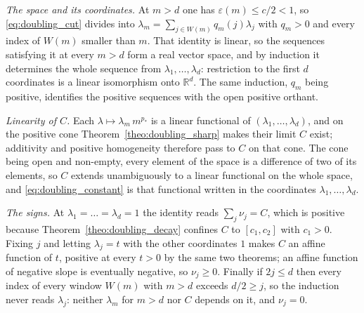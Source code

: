 \emph{The space and its coordinates.} At $m>d$ one has $\varepsilon(m)\leq c/2<1$, so
\eqref{eq:doubling_cut} divides into $\lambda_m=\sum_{j\in W(m)}q_m(j)\lambda_j$ with $q_m>0$
and every index of $W(m)$ smaller than $m$. That identity is linear, so the sequences
satisfying it at every $m>d$ form a real vector space, and by induction it determines the whole
sequence from $\lambda_1,\dots,\lambda_d$: restriction to the first $d$ coordinates is a
linear isomorphism onto $\mathbb R^{d}$. The same induction, $q_m$ being positive, identifies
the positive sequences with the open positive orthant.

\emph{Linearity of $C$.} Each $\lambda\mapsto\lambda_m\,m^{p_*}$ is a linear functional of
$(\lambda_1,\dots,\lambda_d)$, and on the positive cone
Theorem~\ref{theo:doubling_sharp} makes their limit $C$ exist; additivity and positive
homogeneity therefore pass to $C$ on that cone. The cone being open and non-empty, every
element of the space is a difference of two of its elements, so $C$ extends unambiguously to a
linear functional on the whole space, and \eqref{eq:doubling_constant} is that functional
written in the coordinates $\lambda_1,\dots,\lambda_d$.

\emph{The signs.} At $\lambda_1=\dots=\lambda_d=1$ the identity reads $\sum_j\nu_j=C$, which is
positive because Theorem~\ref{theo:doubling_decay} confines $C$ to $[c_1,c_2]$ with $c_1>0$.
Fixing $j$ and letting $\lambda_j=t$ with the other coordinates $1$ makes $C$ an affine
function of $t$, positive at every $t>0$ by the same two theorems; an affine function of
negative slope is eventually negative, so $\nu_j\geq0$. Finally if $2j\leq d$ then every index
of every window $W(m)$ with $m>d$ exceeds $d/2\geq j$, so the induction never reads
$\lambda_j$: neither $\lambda_m$ for $m>d$ nor $C$ depends on it, and $\nu_j=0$.
